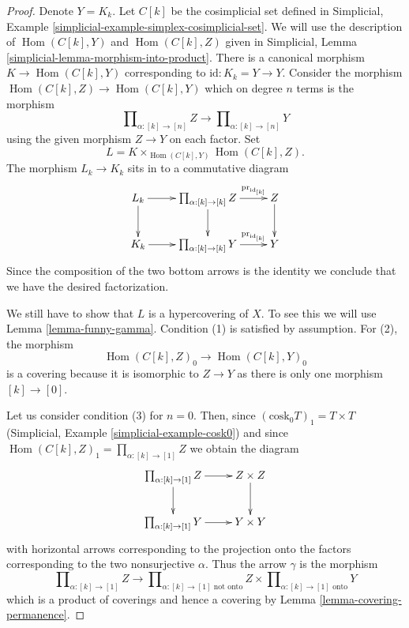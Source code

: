 \documentclass[10pt,a4paper]{amsart}
\theoremstyle{plain}
\theoremstyle{definition}
\theoremstyle{remark}
\numberwithin{equation}{subsection}
\def\Hom{\mathop{\mathrm{Hom}}\nolimits}
\begin{document}
\begin{proof}
Denote $Y = K_k$. Let $C[k]$ be the cosimplicial set defined in
Simplicial, Example \ref{simplicial-example-simplex-cosimplicial-set}.
We will use the description of $\Hom(C[k], Y)$ and $\Hom(C[k], Z)$
given in
Simplicial, Lemma \ref{simplicial-lemma-morphism-into-product}.
There is a canonical morphism
$K \to \Hom(C[k], Y)$ corresponding to $\text{id} : K_k = Y \to Y$.
Consider the morphism $\Hom(C[k], Z) \to \Hom(C[k], Y)$
which on degree $n$ terms is the morphism
$$
\prod\nolimits_{\alpha : [k] \to [n]} Z
\longrightarrow
\prod\nolimits_{\alpha : [k] \to [n]} Y
$$
using the given morphism $Z \to Y$ on each factor. Set
$$
L = K \times_{\Hom(C[k], Y)} \Hom(C[k], Z).
$$
The morphism $L_k \to K_k$ sits in to a commutative diagram
$$
\xymatrix{
L_k \ar[r] \ar[d] &
\prod_{\alpha : [k] \to [k]} Z \ar[r]^-{\text{pr}_{\text{id}_{[k]}}} \ar[d] &
Z \ar[d] \\
K_k \ar[r] &
\prod_{\alpha : [k] \to [k]} Y \ar[r]^-{\text{pr}_{\text{id}_{[k]}}} &
Y
}
$$
Since the composition of the two bottom arrows is the identity
we conclude that we have the desired factorization.

\medskip\noindent
We still have to show that $L$ is a hypercovering of $X$.
To see this we will use Lemma \ref{lemma-funny-gamma}.
Condition (1) is satisfied by assumption.
For (2), the morphism
$$
\Hom(C[k], Z)_0 \to \Hom(C[k], Y)_0
$$
is a covering because it is isomorphic to $Z \to Y$ as
there is only one morphism $[k] \to [0]$.

\medskip\noindent
Let us consider condition (3) for $n = 0$. Then, since
$(\text{cosk}_0 T)_1 = T \times T$
(Simplicial, Example \ref{simplicial-example-cosk0})
and since $\Hom(C[k], Z)_1 = \prod_{\alpha : [k] \to [1]} Z$
we obtain the diagram
$$
\xymatrix{
\prod\nolimits_{\alpha : [k] \to [1]} Z \ar[r] \ar[d] &
Z \times Z \ar[d] \\
\prod\nolimits_{\alpha : [k] \to [1]} Y \ar[r] &
Y \times Y
}
$$
with horizontal arrows corresponding to the projection onto the factors
corresponding to the two nonsurjective $\alpha$. Thus the arrow $\gamma$
is the morphism
$$
\prod\nolimits_{\alpha : [k] \to [1]} Z
\longrightarrow
\prod\nolimits_{\alpha : [k] \to [1]\text{ not onto}} Z
\times
\prod\nolimits_{\alpha : [k] \to [1]\text{ onto}} Y
$$
which is a product of coverings and hence a covering by
Lemma \ref{lemma-covering-permanence}.


\end{proof}
\end{document}
